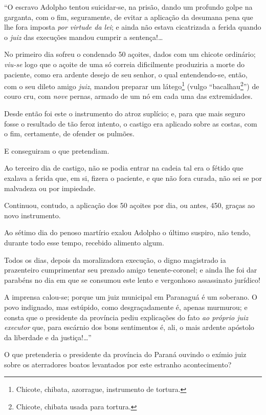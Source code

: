 ``O escravo Adolpho tentou suicidar-se, na prisão, dando um profundo
golpe na garganta, com o fim, seguramente, de evitar a aplicação da
desumana pena que lhe fora imposta \emph{por virtude da lei}; e ainda
não estava cicatrizada a ferida quando o \emph{juiz} das execuções
mandou cumprir a sentença!\ldots{}

No primeiro dia sofreu o condenado 50 açoites, dados com um chicote
ordinário; \emph{viu-se} logo que o açoite de uma só correia
dificilmente produziria a morte do paciente, como era ardente desejo de
seu senhor, o qual entendendo-se, então, com o seu dileto amigo
\emph{juiz}, mandou preparar um látego\footnote{Chicote, chibata,
  azorrague, instrumento de tortura.} (vulgo ``bacalhau\footnote{
  Chicote, chibata usada para tortura.}'') de couro cru, com \emph{nove}
pernas, armado de um nó em cada uma das extremidades.

Desde então foi este o instrumento do atroz suplício; e, para que mais
seguro fosse o resultado de tão feroz intento, o castigo era aplicado
sobre as costas, com o fim, certamente, de ofender os pulmões.

E conseguiram o que pretendiam.

Ao terceiro dia de castigo, não se podia entrar na cadeia tal era o
fétido que exalava a ferida que, em si, fizera o paciente, e que não
fora curada, não sei se por malvadeza ou por impiedade.

Continuou, contudo, a aplicação dos 50 açoites por dia, ou antes, 450,
graças ao novo instrumento.

Ao sétimo dia do penoso martírio exalou Adolpho o último suspiro, não
tendo, durante todo esse tempo, recebido alimento algum.

\noindent\dotfill

Todos os dias, depois da moralizadora execução, o digno magistrado ia
prazenteiro cumprimentar seu prezado amigo tenente-coronel; e ainda lhe
foi dar parabéns no dia em que se consumou este lento e vergonhoso
assassinato jurídico!

\noindent\dotfill

A imprensa calou-se; porque um juiz municipal em Paranaguá é um
soberano. O povo indignado, mas estúpido, como desgraçadamente é, apenas
murmurou; e consta que o presidente da província pediu explicações do
fato \emph{ao próprio juiz executor} que, para escárnio dos bons
sentimentos é, ali, o mais ardente apóstolo da liberdade e da
justiça!\ldots{}''

O que pretenderia o presidente da província do Paraná ouvindo o exímio
juiz sobre os aterradores boatos levantados por este estranho
acontecimento?

